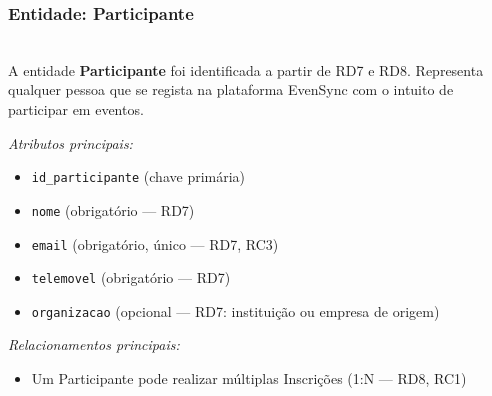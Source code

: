 \documentclass[runningheads]{llncs}
\begin{document}
                \vspace{0.4cm}
                \noindent\begin{minipage}{\textwidth}
                \subsubsection{Entidade: Participante}\mbox{}\\
                A entidade \textbf{Participante} foi identificada a partir de RD7 e RD8. Representa
                qualquer pessoa que se regista na plataforma EvenSync com o intuito de participar
                em eventos.

                \vspace{0.2cm}
                \noindent\textit{Atributos principais:}
                \begin{itemize}
                    \item \texttt{id\_participante} (chave primária)
                    \item \texttt{nome} (obrigatório --- RD7)
                    \item \texttt{email} (obrigatório, único --- RD7, RC3)
                    \item \texttt{telemovel} (obrigatório --- RD7)
                    \item \texttt{organizacao} (opcional --- RD7: instituição ou empresa de origem)
                \end{itemize}

                \vspace{0.2cm}
                \noindent\textit{Relacionamentos principais:}
                \begin{itemize}
                    \item Um Participante pode realizar múltiplas Inscrições (1:N --- RD8, RC1)
                \end{itemize}
                \end{minipage}
\end{document}
